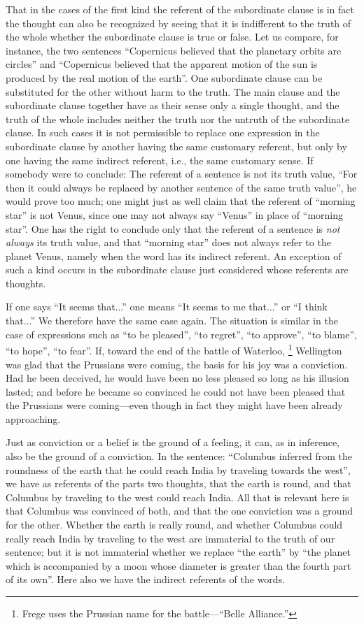 \documentclass[twoside,12pt]{article}
\newcommand{\footnoteAlph}[2][\thefootnote]{%
  \renewcommand{\thefootnote}{\Alph{footnote}}%
  \footnote[#1]{#2}%
  \renewcommand{\thefootnote}{\arabic{footnote}}}
\begin{document}
That in the cases of the first kind the referent of the subordinate
clause is in fact the thought can also be recognized by seeing that it
is indifferent to the truth of the whole whether the subordinate
clause is true or false. Let us compare, for instance, the two
sentences ``Copernicus believed that the planetary orbits are
circles'' and ``Copernicus believed that the apparent motion of the
sun is produced by the real motion of the earth''. One subordinate
clause can be substituted for the other without harm to the truth. The
main clause and the subordinate clause together have as their sense
only a single thought, and the truth of the whole includes neither the
truth nor the untruth of the subordinate clause. In such cases it is
not permissible to replace one expression in the subordinate clause by
another having the same customary referent, but only by one having the
same indirect referent, i.e., the same customary sense. If somebody
were to conclude: The referent of a sentence is not its truth value,
``For then it could always be replaced by another sentence of the same
truth value'', he would prove too much; one might just as well claim
that the referent of ``morning star'' is not Venus, since one may not
always say ``Venus'' in place of ``morning star''. One has the right
to conclude only that the referent of a sentence is \emph{not always}
its truth value, and that ``morning star''  does not
always refer to the planet Venus, namely when the word has its
indirect referent. An exception of such a kind occurs in the
subordinate clause just considered whose referents are thoughts.

If one says ``It seems that...'' one means ``It seems to me that...''
or ``I think that...'' We therefore have the same case again. The
situation is similar in the case of expressions such as ``to be
pleased'', ``to regret'', ``to approve'', ``to blame'', ``to hope'',
``to fear''. If, toward the end of the battle of
Waterloo,\footnoteAlph[5]{Frege uses the Prussian name for the
  battle---``Belle Alliance.''} Wellington was glad that the Prussians
were coming, the basis for his joy was a conviction. Had he been
deceived, he would have been no less pleased so long as his illusion
lasted; and before he became so convinced he could not have been
pleased that the Prussians were coming---even though in fact they might
have been already approaching.

Just as conviction or a belief is the ground of a feeling, it can, as
in inference, also be the ground of a conviction. In the sentence:
``Columbus inferred from the roundness of the earth that he could
reach India by traveling towards the west'', we have as referents of
the parts two thoughts, that the earth is round, and that Columbus by
traveling to the west could reach India. All that is relevant here is
that Columbus was convinced of both, and that the one conviction was a
ground for the other. Whether the earth is really round, and whether
Columbus could really reach India by traveling to the west are
immaterial to the truth of our sentence; but it is not immaterial
whether we replace ``the earth'' by ``the planet which is accompanied
by a moon whose diameter is greater than the fourth part of its own''.
Here also we have the indirect referents of the words.
\end{document}
